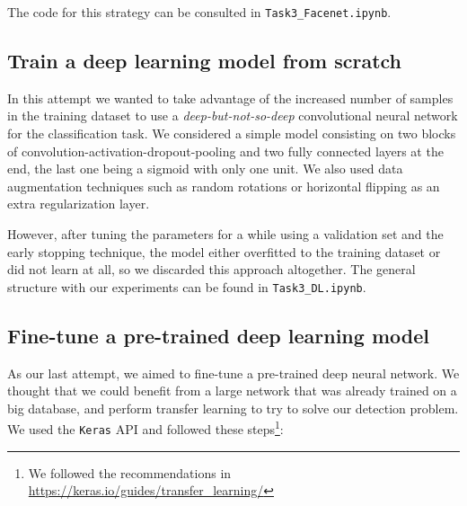 \documentclass[11pt]{article}
\begin{document}
The code for this strategy can be consulted in \texttt{Task3\_Facenet.ipynb}.

\subsection*{Train a deep learning model from scratch}

In this attempt we wanted to take advantage of the increased number of samples in the training dataset to use a \emph{deep-but-not-so-deep} convolutional neural network for the classification task. We considered a simple model consisting on  two blocks of convolution-activation-dropout-pooling and two fully connected layers at the end, the last one being a sigmoid with only one unit. We also used data augmentation techniques such as random rotations or horizontal flipping as an extra regularization layer.

However, after tuning the parameters for a while using a validation set and the early stopping technique, the model either overfitted to the training dataset or did not learn at all, so we discarded this approach altogether. The general structure with our experiments can be found in \texttt{Task3\_DL.ipynb}.

\subsection*{Fine-tune a pre-trained deep learning model}

As our last attempt, we aimed to fine-tune a pre-trained deep neural network. We thought that we could benefit from a large network that was already trained on a big database, and perform transfer learning to try to solve our detection problem. We used the \texttt{Keras} API and followed these steps\footnote{We followed the recommendations in \url{https://keras.io/guides/transfer_learning/}}:
\end{document}
